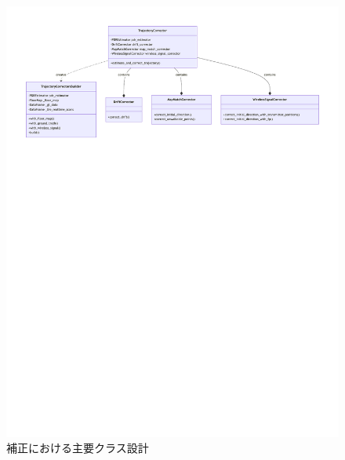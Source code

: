 \begin{figure}[H]
    \centering
    \includegraphics[width=\linewidth]{image/corrector-class-diagram.pdf}
    \caption{補正における主要クラス設計}
    \label{fig:corrector-class}
\end{figure}

